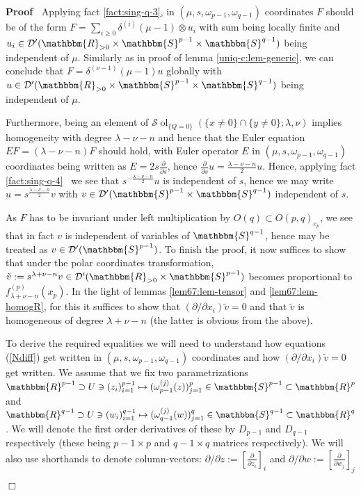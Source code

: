 \documentclass[12pt]{article}
\newcommand{\assign}{:=}
\newcommand{\tmop}[1]{\ensuremath{\operatorname{#1}}}
\renewenvironment{proof}{\noindent\textbf{Proof\ }}{\hspace*{\fill}$\Box$\medskip}
\theoremstyle{remark}
\newcommand{\D}{\mathcal{D}}
\newcommand{\Sp}{\mathbbm{S}}
\newcommand{\R}{\mathbbm{R}}
\begin{document}
\begin{proof}
  Applying fact \ref{fact:sing-q-3}, in $(\mu, s, \omega_{p - 1}, \omega_{q -
  1})$ coordinates $F$ should be of the form $F = \sum_{i \geq 0} \delta^{(i)}
  (\mu - 1) \otimes u_i$ with sum being locally finite and $u_i \in \D'
  (\R_{> 0} \times \Sp^{p - 1} \times \mathbbm{S}^{q - 1})$ being independent
  of $\mu$. Similarly as in proof of lemma \ref{uniq-c:lem-generic}, we can
  conclude that $F = \delta^{(\nu - 1)}  (\mu - 1) u$ globally with $u \in \D'
  (\R_{> 0} \times \mathbbm{S}^{p - 1} \times \mathbbm{S}^{q - 1})$ being
  independent of $\mu$.
  
  Furthermore, being an element of $\mathcal{S} \tmop{ol}_{\{ Q = 0 \}} (\{ x
  \neq 0 \} \cap \{ y \neq 0 \} ; \lambda, \nu)$ implies homogeneity with
  degree $\lambda - \nu - n$ and hence that the Euler equation $EF = (\lambda
  - \nu - n) F$ should hold, with Euler operator $E$ in $(\mu, s, \omega_{p -
  1}, \omega_{q - 1})$ coordinates being written as $E = 2 s
  \frac{\partial}{\partial s}$, hence $\frac{\partial}{\partial s} u =
  \frac{\lambda - \nu - n}{2} u$. Hence, applying fact \ref{fact:sing-q-4} \
  we see that $s^{- \frac{\lambda - \nu - n}{2}} u$ is independent of $s$,
  hence we may write $u = s^{\frac{\lambda - \nu - n}{2}} v$ with $v \in \D'
  (\mathbbm{S}^{p - 1} \times \mathbbm{S}^{q - 1})$ independent of $s$.
  
  As $F$ has to be invariant under left multiplication by $O (q) \subset O (p,
  q)_{e_p}$, we see that in fact $v$ is independent of variables of
  $\mathbbm{S}^{q - 1}$, hence may be treated as $v \in \D' (\mathbbm{S}^{p -
  1})$. To finish the proof, it now suffices to show that under the polar
  coordinates transformation, $\tilde{v} \assign s^{\lambda + \nu - n} v \in
  \D' (\R_{> 0} \times \mathbbm{S}^{p - 1})$ becomes proportional to
  $f_{\lambda + \nu - n}^{(p)} (x_p)$. In the light of lemmas
  \ref{lem67:lem-tensor} and \ref{lem67:lem-homogR}, for this it suffices to
  show that $(\partial / \partial x_i)  \tilde{v} = 0$ and that $\tilde{v}$ is
  homogeneous of degree $\lambda + \nu - n$ (the latter is obvious from the
  above).
  
  To derive the required equalities we will need to understand how equations
  (\ref{Ndiff}) get written in $(\mu, s, \omega_{p - 1}, \omega_{q - 1})$
  coordinates and how $(\partial / \partial x_i)  \tilde{v} = 0$ get written.
  We assume that we fix two parametrizations $\R^{p - 1} \supset U \ni
  (z_i)_{i = 1}^{p - 1} \mapsto (\omega_{p - 1}^{(j)} (z))_{j = 1}^p \in
  \mathbbm{S}^{p - 1} \subset \R^p$ and $\R^{q - 1} \supset U \ni (w_i)_{i =
  1}^{q - 1} \mapsto (\omega_{q - 1}^{(j)} (w))_{j = 1}^q \in \mathbbm{S}^{q -
  1} \subset \R^q$. We will denote the first order derivatives of these by
  $D_{p - 1}$ and $D_{q - 1}$ respectively (these being $p - 1 \times p$ and
  $q - 1 \times q$ matrices respectively). We will also use shorthands to
  denote column-vectors: $\partial / \partial z \assign \left[
  \frac{\partial}{\partial z_i} \right]_i$ and $\partial / \partial w \assign
  \left[ \frac{\partial}{\partial w_j} \right]_j$
  

\end{proof}
\end{document}
